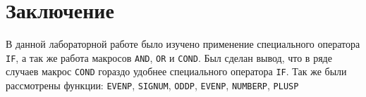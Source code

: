 \section{Заключение}

В данной лабораторной работе было изучено применение специального оператора \verb|IF|, а так же работа макросов \verb|AND|, \verb|OR| и \verb|COND|. Был сделан вывод, что в ряде случаев макрос \verb|COND| гораздо удобнее специального оператора \verb|IF|. Так же были рассмотрены функции: \verb|EVENP|, \verb|SIGNUM|, \verb|ODDP|, \verb|EVENP|, \verb|NUMBERP|, \verb|PLUSP|

